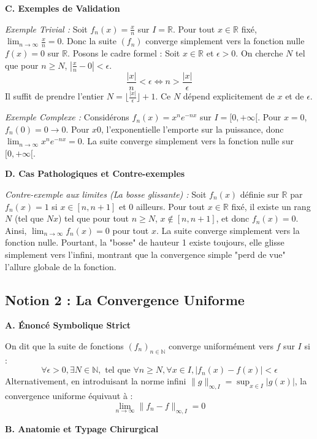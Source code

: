 \documentclass{report}
\begin{document}
\textbf{C. Exemples de Validation}

\textit{Exemple Trivial :}
Soit $f_n(x) = \frac{x}{n}$ sur $I = \mathbb{R}$. Pour tout $x \in \mathbb{R}$ fixé, $\lim_{n \to \infty} \frac{x}{n} = 0$. Donc la suite $(f_n)$ converge simplement vers la fonction nulle $f(x) = 0$ sur $\mathbb{R}$.
Posons le cadre formel : Soit $x \in \mathbb{R}$ et $\epsilon > 0$. On cherche $N$ tel que pour $n \ge N$, $|\frac{x}{n} - 0| < \epsilon$.
$$ \frac{|x|}{n} < \epsilon \iff n > \frac{|x|}{\epsilon} $$
Il suffit de prendre l'entier $N = \lfloor \frac{|x|}{\epsilon} \rfloor + 1$. Ce $N$ dépend explicitement de $x$ et de $\epsilon$.

\textit{Exemple Complexe :}
Considérons $f_n(x) = x^n e^{-nx}$ sur $I = [0, +\infty[$. Pour $x=0$, $f_n(0) = 0 \to 0$. Pour $x 0$, l'exponentielle l'emporte sur la puissance, donc $\lim_{n \to \infty} x^n e^{-nx} = 0$. La suite converge simplement vers la fonction nulle sur $[0, +\infty[$.

\textbf{D. Cas Pathologiques et Contre-exemples}

\textit{Contre-exemple aux limites (La bosse glissante) :}
Soit $f_n(x)$ définie sur $\mathbb{R}$ par $f_n(x) = 1$ si $x \in [n, n+1]$ et $0$ ailleurs.
Pour tout $x \in \mathbb{R}$ fixé, il existe un rang $N$ (tel que $N x$) tel que pour tout $n \ge N$, $x \notin [n, n+1]$, et donc $f_n(x) = 0$.
Ainsi, $\lim_{n \to \infty} f_n(x) = 0$ pour tout $x$. La suite converge simplement vers la fonction nulle. Pourtant, la "bosse" de hauteur 1 existe toujours, elle glisse simplement vers l'infini, montrant que la convergence simple "perd de vue" l'allure globale de la fonction.

\subsection*{Notion 2 : La Convergence Uniforme}

\textbf{A. Énoncé Symbolique Strict}

On dit que la suite de fonctions $(f_n)_{n \in \mathbb{N}}$ converge uniformément vers $f$ sur $I$ si :
$$ \forall \epsilon > 0, \exists N \in \mathbb{N}, \text{ tel que } \forall n \ge N, \forall x \in I, |f_n(x) - f(x)| < \epsilon $$
Alternativement, en introduisant la norme infini $\|g\|_{\infty, I} = \sup_{x \in I} |g(x)|$, la convergence uniforme équivaut à :
$$ \lim_{n \to \infty} \|f_n - f\|_{\infty, I} = 0 $$

\textbf{B. Anatomie et Typage Chirurgical}
\end{document}
